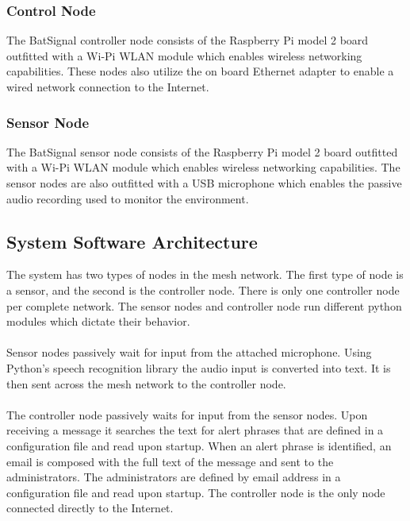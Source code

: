 \documentclass[11pt,a4paper]{article}
\begin{document}
\subsubsection{Control Node}
The BatSignal controller node consists of the Raspberry Pi model 2 board outfitted with a Wi-Pi WLAN module which enables wireless networking capabilities. These nodes also utilize the on board Ethernet adapter to enable a wired network connection to the Internet.

\subsubsection{Sensor Node}
The BatSignal sensor node consists of the Raspberry Pi model 2 board outfitted with a Wi-Pi WLAN module which enables wireless networking capabilities. The sensor nodes are also outfitted with a USB microphone which enables the passive audio recording used to monitor the environment.

\subsection{System Software Architecture}
The system has two types of nodes in the mesh network. The first type of node is a sensor, and the second is the controller node.  There is only one controller node per complete network. The sensor nodes and controller node run different python modules which dictate their behavior. \\\\
Sensor nodes passively wait for input from the attached microphone.  Using Python's speech recognition library the audio input is converted into text.  It is then sent across the mesh network to the controller node. \\\\
The controller node passively waits for input from the sensor nodes. Upon receiving a message it searches the text for alert phrases that are defined in a configuration file and read upon startup. When an alert phrase is identified, an email is composed with the full text of the message and sent to the administrators. The administrators are defined by email address in a configuration file and read upon startup. The controller node is the only node connected directly to the Internet.
\end{document}
